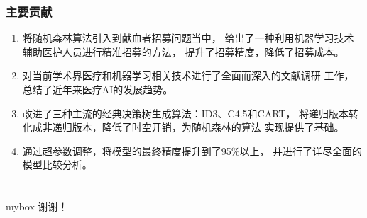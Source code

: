 \documentclass[10pt,aspectratio=43,mathserif]{beamer}
\begin{document}
		\begin{frame}
		  \frametitle{\textbf{主要贡献}}
          \begin{enumerate}
            \item 将随机森林算法引入到献血者招募问题当中，
            给出了一种利用机器学习技术辅助医护人员进行精准招募的方法，
            提升了招募精度，降低了招募成本。
            \item 对当前学术界医疗和机器学习相关技术进行了全面而深入的文献调研
            工作，总结了近年来医疗AI的发展趋势。
            \item 改进了三种主流的经典决策树生成算法：ID3、C4.5和CART，
            将递归版本转化成非递归版本，降低了时空开销，为随机森林的算法
            实现提供了基础。
            \item 通过超参数调整，将模型的最终精度提升到了95\%以上，
            并进行了详尽全面的模型比较分析。
        \end{enumerate}
        
		\end{frame}


\section*{}
            \begin{frame}

                \begin{center}
                    \begin{minipage}{1\textwidth}
                        \begin{beamercolorbox}[wd=0.70\textwidth, rounded=true, shadow=true]{mybox}
                        \LARGE \centering 谢谢！
                        \end{beamercolorbox}
                    \end{minipage}
                \end{center}

            \end{frame}
\end{document}
